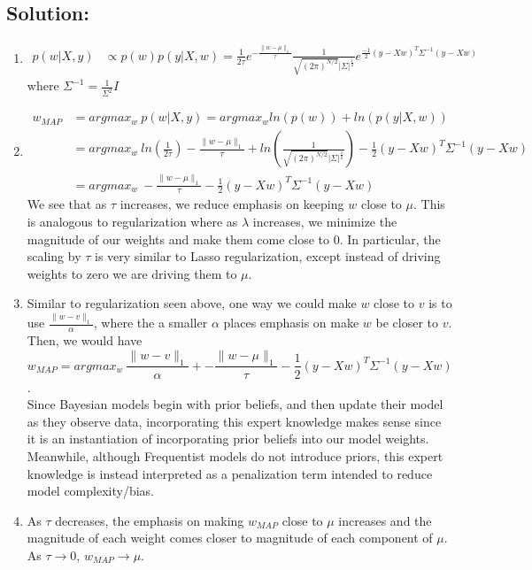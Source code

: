\documentclass[submit]{harvardml}
\begin{document}
\subsection*{Solution:}
\begin{enumerate}
    \item 
    \begin{align}
        p(w | X,y) &\propto p(w)p(y|X, w) = \frac{1}{2\tau}e^{-\frac{\|{w}-{\mu}\|_1}{\tau}} \frac{1}{\sqrt{(2 \pi)^{N/2}}|\Sigma|^{\frac{1}{2}}} e^{\frac{-1}{2}(y - Xw)^T \Sigma^{-1} (y-Xw)} 
    \end{align}
    where $\Sigma^{-1} = \frac{1}{\Sigma^2}I$ 
    \item 
    \begin{align}
        w_{MAP} &= argmax_w \ p(w| X,y) = argmax_w ln(p(w)) + ln(p(y|X, w)) \\
        &= argmax_w \ ln(\frac{1}{2\tau}) -\frac{\|{w}-{\mu}\|_1}{\tau} + ln(\frac{1}{\sqrt{(2 \pi)^{N/2}}|\Sigma|^{\frac{1}{2}}}) - \frac{1}{2}(y - Xw)^T \Sigma^{-1} (y-Xw) \\
         &= argmax_w \ -\frac{\|{w}-{\mu}\|_1}{\tau}  - \frac{1}{2}(y - Xw)^T \Sigma^{-1} (y-Xw) 
    \end{align}
    We see that as $\tau$ increases, we reduce emphasis on keeping $w$ close to $\mu$. This is analogous to regularization where as $\lambda$ increases, we minimize the magnitude of our weights and make them come close to $0$. In particular, the scaling by $\tau$ is very similar to Lasso regularization, except instead of driving weights to zero we are driving them to $\mu$. 
    \item Similar to regularization seen above, one way we could make $w$ close to $v$ is to use $\frac{\|{w}-{v}\|_1}{\alpha}$, where the a smaller $\alpha$ places emphasis on make $w$ be closer to $v$. Then, we would have $$w_{MAP} =  argmax_w \ \frac{\|{w}-{v}\|_1}{\alpha} +  -\frac{\|{w}-{\mu}\|_1}{\tau}  - \frac{1}{2}(y - Xw)^T \Sigma^{-1} (y-Xw) $$. \\
    Since Bayesian models begin with prior beliefs, and then update their model as they observe data, incorporating this expert knowledge makes sense since it is an instantiation of incorporating prior beliefs into our model weights. \\
    Meanwhile, although Frequentist models do not introduce priors, this expert knowledge is instead interpreted as a penalization term intended to reduce model complexity/bias.
    \item As $\tau$ decreases, the emphasis on making $w_{MAP}$ close to $\mu$ increases and the magnitude of each weight comes closer to magnitude of each component of $\mu$. As $\tau \to 0$, $w_{MAP} \to \mu$. 
\end{enumerate}
\end{document}
